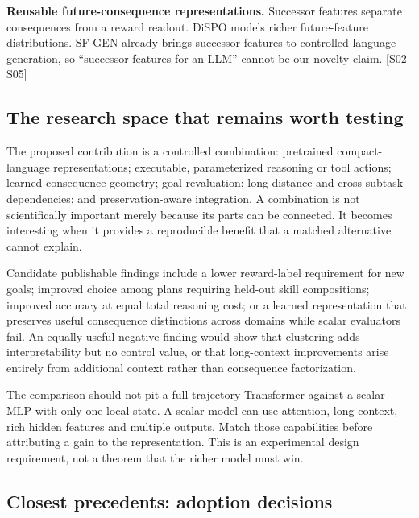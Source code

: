 \documentclass[
  11pt,
  a4paper,
]{article}
\begin{document}
\textbf{Reusable future-consequence representations.} Successor features
separate consequences from a reward readout. DiSPO models richer
future-feature distributions. SF-GEN already brings successor features
to controlled language generation, so ``successor features for an LLM''
cannot be our novelty claim. {[}S02--S05{]}

\subsection{The research space that remains worth
testing}\label{the-research-space-that-remains-worth-testing}

The proposed contribution is a controlled combination: pretrained
compact-language representations; executable, parameterized reasoning or
tool actions; learned consequence geometry; goal revaluation;
long-distance and cross-subtask dependencies; and preservation-aware
integration. A combination is not scientifically important merely
because its parts can be connected. It becomes interesting when it
provides a reproducible benefit that a matched alternative cannot
explain.

Candidate publishable findings include a lower reward-label requirement
for new goals; improved choice among plans requiring held-out skill
compositions; improved accuracy at equal total reasoning cost; or a
learned representation that preserves useful consequence distinctions
across domains while scalar evaluators fail. An equally useful negative
finding would show that clustering adds interpretability but no control
value, or that long-context improvements arise entirely from additional
context rather than consequence factorization.

The comparison should not pit a full trajectory Transformer against a
scalar MLP with only one local state. A scalar model can use attention,
long context, rich hidden features and multiple outputs. Match those
capabilities before attributing a gain to the representation. This is an
experimental design requirement, not a theorem that the richer model
must win.

\subsection{Closest precedents: adoption
decisions}\label{closest-precedents-adoption-decisions}
\end{document}

